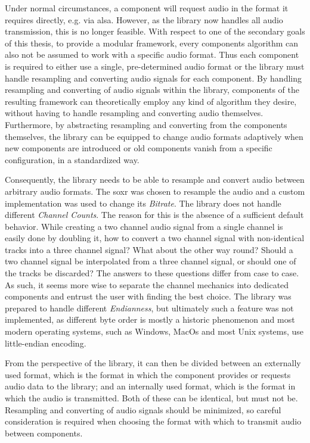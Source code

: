Under normal circumstances, a component will request audio in the format it requires directly, e.g. via \gls{alsa}.
However, as the library now handles all audio transmission, this is no longer feasible.
With respect to one of the secondary goals of this thesis, to provide a modular framework, every components algorithm can also not be assumed to work with a specific audio format.
Thus each component is required to either use a single, pre-determined audio format or the library must handle resampling and converting audio signals for each component.
By handling resampling and converting of audio signals within the library, components of the resulting framework can theoretically employ any kind of algorithm they desire, without having to handle resampling and converting audio themselves.
Furthermore, by abstracting resampling and converting from the components themselves, the library can be equipped to change audio formats adaptively when new components are introduced or old components vanish from a specific configuration, in a standardized way.

Consequently, the library needs to be able to resample and convert audio between arbitrary audio formats.
The \gls{soxr} \cite{soxr,soxrbase} was chosen to resample the audio and a custom implementation was used to change its \textit{Bitrate}.
The library does not handle different \textit{Channel Counts}.
The reason for this is the absence of a sufficient default behavior.
While creating a two channel audio signal from a single channel is easily done by doubling it, how to convert a two channel signal with non-identical tracks into a three channel signal?
What about the other way round?
Should a two channel signal be interpolated from a three channel signal, or should one of the tracks be discarded?
The answers to these questions differ from case to case.
As such, it seems more wise to separate the channel mechanics into dedicated components and entrust the user with finding the best choice. 
The library was prepared to handle different \textit{Endianness}, but ultimately such a feature was not implemented, as different byte order is mostly a historic phenomenon and most modern operating systems, such as Windows, MacOs and most Unix systems, use little-endian encoding.

From the perspective of the library, it can then be divided between an externally used format, which is the format in which the component provides or requests audio data to the library; and an internally used format, which is the format in which the audio is transmitted.
Both of these can be identical, but must not be.
Resampling and converting of audio signals should be minimized, so careful consideration is required when choosing the format with which to transmit audio between components.

